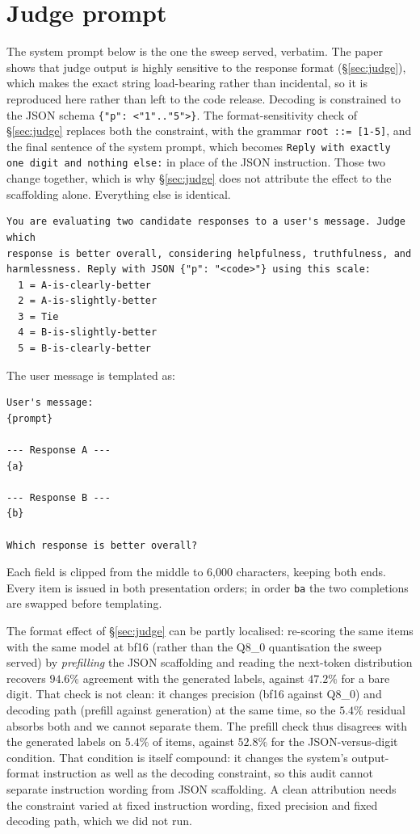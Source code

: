 \documentclass{article}
\begin{document}
\section{Judge prompt}\label{app:prompt}

The system prompt below is the one the sweep served, verbatim. The paper shows that judge
output is highly sensitive to the response format (\S\ref{sec:judge}), which makes the exact
string load-bearing rather than incidental, so it is reproduced here rather than left to the
code release. Decoding is constrained to the JSON schema \verb|{"p": <"1".."5">}|. The
format-sensitivity check of \S\ref{sec:judge} replaces both the constraint, with the grammar
\verb|root ::= [1-5]|, and the final sentence of the system prompt, which becomes
\verb|Reply with exactly one digit and nothing else:| in place of the JSON instruction. Those
two change together, which is why \S\ref{sec:judge} does not attribute the effect to the
scaffolding alone. Everything else is identical.

\begin{verbatim}
You are evaluating two candidate responses to a user's message. Judge which
response is better overall, considering helpfulness, truthfulness, and
harmlessness. Reply with JSON {"p": "<code>"} using this scale:
  1 = A-is-clearly-better
  2 = A-is-slightly-better
  3 = Tie
  4 = B-is-slightly-better
  5 = B-is-clearly-better
\end{verbatim}

\noindent The user message is templated as:

\begin{verbatim}
User's message:
{prompt}

--- Response A ---
{a}

--- Response B ---
{b}

Which response is better overall?
\end{verbatim}

\noindent Each field is clipped from the middle to 6{,}000 characters, keeping both ends.
Every item is issued in both presentation orders; in order \texttt{ba} the two completions
are swapped before templating.

\noindent The format effect of \S\ref{sec:judge} can be partly localised: re-scoring the same
items with the same model at bf16 (rather than the Q8\_0 quantisation the sweep
served) by \emph{prefilling} the JSON scaffolding and reading the next-token
distribution recovers $94.6\%$ agreement with the generated labels, against
$47.2\%$ for a bare digit. That check is not clean: it changes precision (bf16 against Q8\_0) and decoding path
(prefill against generation) at the same time, so the $5.4\%$ residual absorbs both and we
cannot separate them. The prefill check thus disagrees with the generated labels on
$5.4\%$ of items, against $52.8\%$ for the JSON-versus-digit condition.
That condition is itself compound: it changes the system's output-format instruction as well
as the decoding constraint, so this audit cannot separate instruction wording from JSON
scaffolding. A clean attribution needs the constraint varied at fixed instruction wording,
fixed precision and fixed decoding path, which we did not run.
\end{document}
